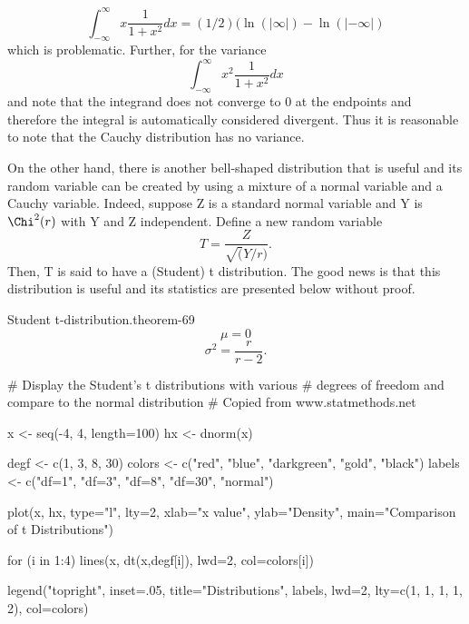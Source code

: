 \documentclass[10pt,]{book}
\numberwithin{equation}{section}
\begin{document}
\begin{equation*}
\int_{-\infty}^{\infty} x \frac{1}{1+x^2} dx = (1/2) ( \ln( | \infty |) - \ln( | -\infty |)
\end{equation*}
which is problematic.  Further, for the variance%
\begin{equation*}
\int_{-\infty}^{\infty} x^2 \frac{1}{1+x^2} dx 
\end{equation*}
and note that the integrand does not converge to 0 at the endpoints and therefore the integral is automatically considered divergent.  Thus it is reasonable to note that the Cauchy distribution has no variance.%
\par
\hypertarget{p-1056}{}%
On the other hand, there is another bell-shaped distribution that is useful and its random variable can be created by using a mixture of a normal variable and a Cauchy variable. Indeed, suppose Z is a standard normal variable and Y is \(\Chi^2(r)\) with Y and Z independent.  Define a new random variable%
\begin{equation*}
T = \frac{Z}{\sqrt(Y/r)}.
\end{equation*}
Then, T is said to have a (Student) t distribution.  The good news is that this distribution is useful and its statistics are presented below without proof. \begin{theorem}{Student t-distribution.}{}{theorem-69}%
%
\begin{equation*}
\mu = 0
\end{equation*}
%
\begin{equation*}
\sigma^2 = \frac{r}{r-2}.
\end{equation*}
\end{theorem}
%
\begin{sageinput}
# Display the Student's t distributions with various
# degrees of freedom and compare to the normal distribution
# Copied from www.statmethods.net

x <- seq(-4, 4, length=100)
hx <- dnorm(x)

degf <- c(1, 3, 8, 30)
colors <- c("red", "blue", "darkgreen", "gold", "black")
labels <- c("df=1", "df=3", "df=8", "df=30", "normal")

plot(x, hx, type="l", lty=2, xlab="x value",
  ylab="Density", main="Comparison of t Distributions")

for (i in 1:4){
  lines(x, dt(x,degf[i]), lwd=2, col=colors[i])
}

legend("topright", inset=.05, title="Distributions",
  labels, lwd=2, lty=c(1, 1, 1, 1, 2), col=colors)
\end{sageinput}
%
%
\typeout{************************************************}
\typeout{************************************************}
%
\end{document}
